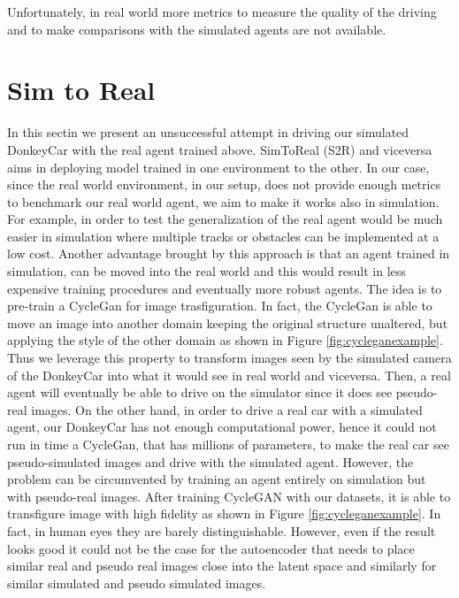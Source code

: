 Unfortunately, in real world more metrics to measure the quality of the driving and to make comparisons with the simulated agents are not available. 

\section{Sim to Real}

In this sectin we present an unsuccessful attempt in driving our simulated DonkeyCar with the real agent trained above. SimToReal (S2R) and viceversa aims in deploying model trained in one environment to the other. In our case, since the real world environment, in our setup, does not provide enough metrics to benchmark our real world agent, we aim to make it works also in simulation. For example, in order to test the generalization of the real agent would be much easier in simulation where multiple tracks or obstacles can be implemented at a low cost. Another advantage brought by this approach is that an agent trained in simulation, can be moved into the real world and this would result in less expensive training procedures and eventually more robust agents. The idea is to pre-train a CycleGan \citep{CycleGAN2017} for image trasfiguration. In fact, the CycleGan is able to move an image into another domain keeping the original structure unaltered, but applying the style of the other domain as shown in Figure \ref{fig:cycleganexample}. Thus we leverage this property to transform images seen by the simulated camera of the DonkeyCar into what it would see in real world and viceversa. Then, a real agent will eventually be able to drive on the simulator since it does see pseudo-real images. On the other hand, in order to drive a real car with a simulated agent, our DonkeyCar has not enough computational power, hence it could not run in time a CycleGan, that has millions of parameters, to make the real car see pseudo-simulated images and drive with the simulated agent. However, the problem can be circumvented by training an agent entirely on simulation but with pseudo-real images. After training CycleGAN with our datasets, it is able to transfigure image with high fidelity as shown in Figure \ref{fig:cycleganexample}. In fact, in human eyes they are barely distinguishable. However, even if the result looks good it could not be the case for the autoencoder that needs to place similar real and pseudo real images close into the latent space and similarly for similar simulated and pseudo simulated images.

